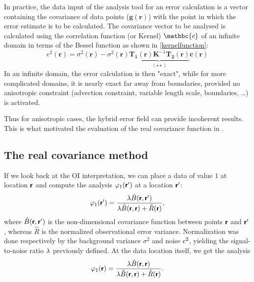 In practice, the data input of the analysis tool for an error calculation is a vector containing the
covariance of data points ($\mathbf{g}(\mathbf{r})$) with the point in which the error estimate is to be calculated. The covariance vector to be analysed is calculated using the correlation function (or Kernel) $\mathbc{c}$ of an infinite domain in terms of the Bessel function as shown in \eqref{kernelfunction}:
\begin{equation}
e^{2}(\mathbf{r})   = \sigma^{2}(\mathbf{r})-\sigma^{2}(\mathbf{r}) \underbrace{\mathbf{T_{1}}(\mathbf{r})\mathbf{K}^{-1} \mathbf{T_{2}}(\mathbf{r})}_{(\star\star)}		\mathbf{c}(\mathbf{r})
\label{eq:kernelbessel}
\end{equation}
In an infinite domain, the error calculation is then "exact", while for more complicated domains, it is nearly exact far away from boundaries, provided no anisotropic constraint (advection constraint, variable length scale, boundaries, \ldots) is activated. 

Thus for anisotropic cases, the hybrid error field can provide incoherent results. This is what motivated the evaluation of the real covariance function in \diva.


\subsection{The real covariance method\label{sec:realcovariance}}

If we look back at the OI interpretation, we can place a data of value $1$ at location $\mbox{\boldmath $ \protect\mathsf{r} $}$ and compute the analysis $\varphi_1(\mbox{\boldmath $ \protect\mathsf{r} $}^\prime)$ at a location $\mbox{\boldmath $ \protect\mathsf{r} $}^\prime$:
\begin{equation}
\varphi_1(\mbox{\boldmath $ \protect\mathsf{r} $}^\prime) = {\lambda \hat{B} (\mbox{\boldmath $ \protect\mathsf{r} $},\mbox{\boldmath $ \protect\mathsf{r} $}^\prime)\over  \lambda \hat{B}(\mbox{\boldmath $ \protect\mathsf{r} $},\mbox{\boldmath $ \protect\mathsf{r} $}) + \hat{R}(\mbox{\boldmath $ \protect\mathsf{r} $}) },
\end{equation}
where $\hat{B}(\mbox{\boldmath $ \protect\mathsf{r} $},\mbox{\boldmath $ \protect\mathsf{r} $}^\prime)$ is the non-dimensional covariance function between points $\mbox{\boldmath $ \protect\mathsf{r} $}$ and $\mbox{\boldmath $ \protect\mathsf{r} $}^\prime$, whereas $\hat{R}$ is the normalized observational error variance. Normalization was done respectively by the background variance $\sigma^2$ and noise $\epsilon^2$, yielding the signal-to-noise ratio $\lambda$ previously defined. 
At the data location itself, we get the analysis
\begin{equation}
\varphi_1(\mbox{\boldmath $ \protect\mathsf{r} $}) = {\lambda \hat{B} (\mbox{\boldmath $ \protect\mathsf{r} $},\mbox{\boldmath $ \protect\mathsf{r} $}) \over \lambda \hat{B}(\mbox{\boldmath $ \protect\mathsf{r} $},\mbox{\boldmath $ \protect\mathsf{r} $}) + \hat{R}(\mbox{\boldmath $ \protect\mathsf{r} $}) }.
\end{equation}

